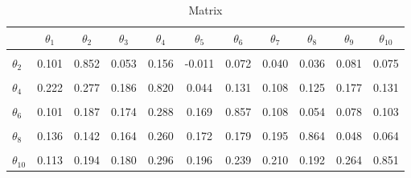 \documentclass[
  10pt,
  a4paper,
  twoside]{article}
\begin{document}
\begin{table}[H]
\centering
\caption{\label{tab:cor-parcor-table}Matrix}
\centering
\begin{tabular}[t]{lcccccccccc}
\toprule
  & $\theta_{1}$ & $\theta_{2}$ & $\theta_{3}$ & $\theta_{4}$ & $\theta_{5}$ & $\theta_{6}$ & $\theta_{7}$ & $\theta_{8}$ & $\theta_{9}$ & $\theta_{10}$\\
\midrule
\cellcolor{gray!10}{$\theta_{1}$} & \cellcolor{gray!10}{0.844} & \cellcolor{gray!10}{0.016} & \cellcolor{gray!10}{0.066} & \cellcolor{gray!10}{0.125} & \cellcolor{gray!10}{0.053} & \cellcolor{gray!10}{-0.003} & \cellcolor{gray!10}{0.040} & \cellcolor{gray!10}{0.051} & \cellcolor{gray!10}{0.081} & \cellcolor{gray!10}{0.005}\\
$\theta_{2}$ & 0.101 & 0.852 & 0.053 & 0.156 & -0.011 & 0.072 & 0.040 & 0.036 & 0.081 & 0.075\\
\cellcolor{gray!10}{$\theta_{3}$} & \cellcolor{gray!10}{0.130} & \cellcolor{gray!10}{0.139} & \cellcolor{gray!10}{0.869} & \cellcolor{gray!10}{0.046} & \cellcolor{gray!10}{0.010} & \cellcolor{gray!10}{0.076} & \cellcolor{gray!10}{0.063} & \cellcolor{gray!10}{0.078} & \cellcolor{gray!10}{0.048} & \cellcolor{gray!10}{0.079}\\
$\theta_{4}$ & 0.222 & 0.277 & 0.186 & 0.820 & 0.044 & 0.131 & 0.108 & 0.125 & 0.177 & 0.131\\
\cellcolor{gray!10}{$\theta_{5}$} & \cellcolor{gray!10}{0.115} & \cellcolor{gray!10}{0.080} & \cellcolor{gray!10}{0.094} & \cellcolor{gray!10}{0.176} & \cellcolor{gray!10}{0.836} & \cellcolor{gray!10}{0.073} & \cellcolor{gray!10}{0.111} & \cellcolor{gray!10}{0.090} & \cellcolor{gray!10}{0.014} & \cellcolor{gray!10}{0.107}\\
\addlinespace
$\theta_{6}$ & 0.101 & 0.187 & 0.174 & 0.288 & 0.169 & 0.857 & 0.108 & 0.054 & 0.078 & 0.103\\
\cellcolor{gray!10}{$\theta_{7}$} & \cellcolor{gray!10}{0.141} & \cellcolor{gray!10}{0.163} & \cellcolor{gray!10}{0.166} & \cellcolor{gray!10}{0.280} & \cellcolor{gray!10}{0.200} & \cellcolor{gray!10}{0.239} & \cellcolor{gray!10}{0.851} & \cellcolor{gray!10}{0.070} & \cellcolor{gray!10}{0.147} & \cellcolor{gray!10}{0.054}\\
$\theta_{8}$ & 0.136 & 0.142 & 0.164 & 0.260 & 0.172 & 0.179 & 0.195 & 0.864 & 0.048 & 0.064\\
\cellcolor{gray!10}{$\theta_{9}$} & \cellcolor{gray!10}{0.179} & \cellcolor{gray!10}{0.210} & \cellcolor{gray!10}{0.167} & \cellcolor{gray!10}{0.342} & \cellcolor{gray!10}{0.138} & \cellcolor{gray!10}{0.232} & \cellcolor{gray!10}{0.281} & \cellcolor{gray!10}{0.189} & \cellcolor{gray!10}{0.840} & \cellcolor{gray!10}{0.121}\\
$\theta_{10}$ & 0.113 & 0.194 & 0.180 & 0.296 & 0.196 & 0.239 & 0.210 & 0.192 & 0.264 & 0.851\\
\bottomrule
\end{tabular}
\end{table}
\vspace{-1em}
\begingroup
\setlength{\baselineskip}{1em}
\end{document}
